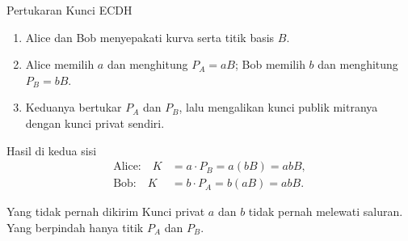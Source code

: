 \documentclass[aspectratio=169,11pt]{beamer}
\begin{document}
\begin{frame}{Pertukaran Kunci ECDH}
    \begin{enumerate}
        \item Alice dan Bob menyepakati kurva serta titik basis $B$.
        \item Alice memilih $a$ dan menghitung $P_A = aB$; Bob memilih $b$
              dan menghitung $P_B = bB$.
        \item Keduanya bertukar $P_A$ dan $P_B$, lalu mengalikan kunci publik
              mitranya dengan kunci privat sendiri.
    \end{enumerate}
    \vspace{0.1cm}
    \begin{block}{Hasil di kedua sisi}
        \[
        \begin{aligned}
            \text{Alice:}\quad K &= a \cdot P_B = a(bB) = abB, \\
            \text{Bob:}\quad   K &= b \cdot P_A = b(aB) = abB .
        \end{aligned}
        \]
    \end{block}
    \vspace{0.05cm}
    \begin{alertblock}{Yang tidak pernah dikirim}
        \footnotesize
        Kunci privat $a$ dan $b$ tidak pernah melewati saluran. Yang berpindah
        hanya titik $P_A$ dan $P_B$.
    \end{alertblock}
\end{frame}
\end{document}
